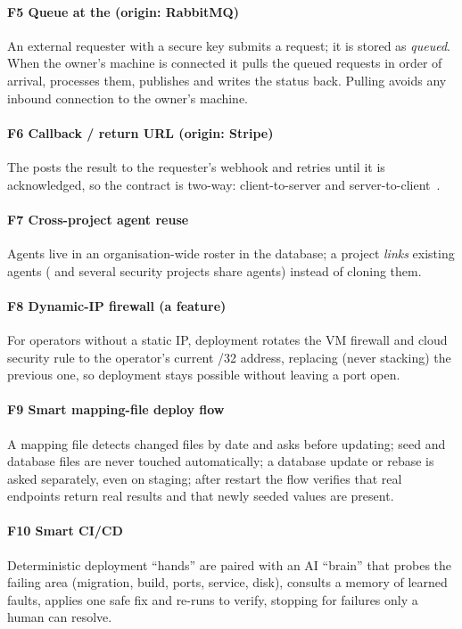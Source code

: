 \paragraph*{F5 Queue at the \hub{} (origin: RabbitMQ)} An external requester with a secure key submits a request; it is stored as \emph{queued}. When the owner's machine is connected it pulls the queued requests in order of arrival, processes them, publishes and writes the status back. Pulling avoids any inbound connection to the owner's machine.

\paragraph*{F6 Callback / return URL (origin: Stripe)} The \hub{} posts the result to the requester's webhook and retries until it is acknowledged, so the contract is two-way: client-to-server and server-to-client~\cite{stripewebhooks}.

\paragraph*{F7 Cross-project agent reuse} Agents live in an organisation-wide roster in the database; a project \emph{links} existing agents (\vendors{} and several security projects share agents) instead of cloning them.

\paragraph*{F8 Dynamic-IP firewall (a feature)} For operators without a static IP, deployment rotates the VM firewall and cloud security rule to the operator's current /32 address, replacing (never stacking) the previous one, so deployment stays possible without leaving a port open.

\paragraph*{F9 Smart mapping-file deploy flow} A mapping file detects changed files by date and asks before updating; seed and database files are never touched automatically; a database update or rebase is asked separately, even on staging; after restart the flow verifies that real endpoints return real results and that newly seeded values are present.

\paragraph*{F10 Smart CI/CD} Deterministic deployment ``hands'' are paired with an AI ``brain'' that probes the failing area (migration, build, ports, service, disk), consults a memory of learned faults, applies one safe fix and re-runs to verify, stopping for failures only a human can resolve.

